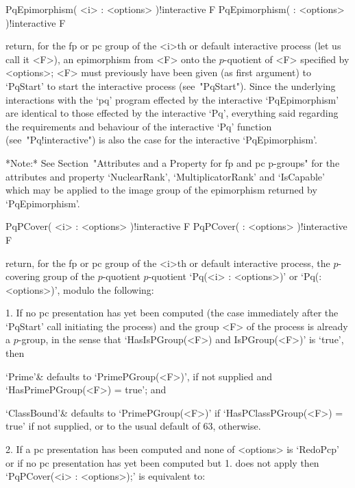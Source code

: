 \>PqEpimorphism( <i> : <options> )!{interactive} F
\>PqEpimorphism( : <options> )!{interactive} F

return, for the fp or pc  group  of  the  <i>th  or  default  interactive
{\ANUPQ} process (let us call it <F>), an epimorphism from <F>  onto  the
$p$-quotient of <F> specified by <options>; <F> must previously have been
given (as first argument) to `PqStart' to start the interactive  {\ANUPQ}
process (see~"PqStart"). Since the underlying interactions with the  `pq'
program effected by the interactive `PqEpimorphism' are identical to those
effected  by  the  interactive  `Pq',  everything  said   regarding   the
requirements   and   behaviour   of   the   interactive   `Pq'   function
(see~"Pq!interactive")   is   also   the   case   for   the   interactive
`PqEpimorphism'.

*Note:*
See Section~"Attributes and a Property for fp and pc  p-groups"  for  the
attributes   and   property   `NuclearRank',   `MultiplicatorRank'    and
`IsCapable' which may be applied to the image group  of  the  epimorphism
returned by `PqEpimorphism'.

\>PqPCover( <i> : <options> )!{interactive} F
\>PqPCover( : <options> )!{interactive} F

return, for the fp or pc  group  of  the  <i>th  or  default  interactive
{\ANUPQ} process, the $p$-covering group of the $p$-quotient $p$-quotient
`Pq(<i> : <options>)' or `Pq(: <options>)', modulo the following:

\beginlist%

\item{1.}
If no pc presentation has yet been computed (the case  immediately  after
the `PqStart' call initiating the process)  and  the  group  <F>  of  the
process is already a $p$-group, in the sense that  `HasIsPGroup(<F>)  and
IsPGroup(<F>)' is `true', then

\endlist
\beginitems

`Prime'& 
defaults to `PrimePGroup(<F>)', if not supplied and  `HasPrimePGroup(<F>)
= true'; and

`ClassBound'&
defaults to `PrimePGroup(<F>)' if `HasPClassPGroup(<F>) =  true'  if  not
supplied, or to the usual default of 63, otherwise.

\enditems
\beginlist%

\item{2.}
If a pc presentation has been computed and none of <options> is `RedoPcp'
or if no pc presentation has yet been computed but 1. does not apply then
`PqPCover(<i> : <options>);' is equivalent to:

